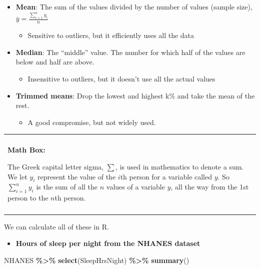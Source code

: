 \documentclass[
]{book}
\newenvironment{Shaded}{\begin{snugshade}}{\end{snugshade}}
\newcommand{\FunctionTok}[1]{\textcolor[rgb]{0.13,0.29,0.53}{\textbf{#1}}}
\newcommand{\NormalTok}[1]{#1}
\newcommand{\SpecialCharTok}[1]{\textcolor[rgb]{0.81,0.36,0.00}{\textbf{#1}}}
\providecommand{\tightlist}{%
  \setlength{\itemsep}{0pt}\setlength{\parskip}{0pt}}
\newenvironment{mathbox}
{
    \begin{center}
    
    \begin{tabular}{|p{0.8\textwidth}|}
    \rowcolor{LightYellow}
    \hline\\
    \rowcolor{LightYellow}
    \textbf{Math Box:}
}
{
    \\\rowcolor{LightYellow}
    \\\hline
    \end{tabular} 
    \end{center}
}
\begin{document}
\begin{itemize}
\tightlist
\item
  \textbf{Mean}: The sum of the values divided by the number of values (sample size), \(\bar{y} = \frac{\sum^n_{i=1}y_i}{n}\)

  \begin{itemize}
  \tightlist
  \item
    Sensitive to outliers, but it efficiently uses all the data
  \end{itemize}
\item
  \textbf{Median}: The ``middle'' value. The number for which half of the values are below and half are above.

  \begin{itemize}
  \tightlist
  \item
    Insensitive to outliers, but it doesn't use all the actual values
  \end{itemize}
\item
  \textbf{Trimmed means}: Drop the lowest and highest k\% and take the mean of the rest.

  \begin{itemize}
  \tightlist
  \item
    A good compromise, but not widely used.
  \end{itemize}
\end{itemize}

\begin{mathbox}
The Greek capital letter sigma, \(\sum\), is used in mathematics to
denote a sum. We let \(y_i\) represent the value of the \(i\)th person
for a variable called \(y\). So \(\sum^n_{i=1}y_i\) is the sum of all
the \(n\) values of a variable \(y\), all the way from the 1st person to
the \(n\)th person.
\end{mathbox}

We can calculate all of these in R.

\begin{itemize}
\tightlist
\item
  \textbf{Hours of sleep per night from the NHANES dataset}
\end{itemize}

\begin{Shaded}
\begin{Highlighting}[]
\NormalTok{NHANES }\SpecialCharTok{\%\textgreater{}\%}
  \FunctionTok{select}\NormalTok{(SleepHrsNight) }\SpecialCharTok{\%\textgreater{}\%}
  \FunctionTok{summary}\NormalTok{()}
\end{Highlighting}
\end{Shaded}
\end{document}
